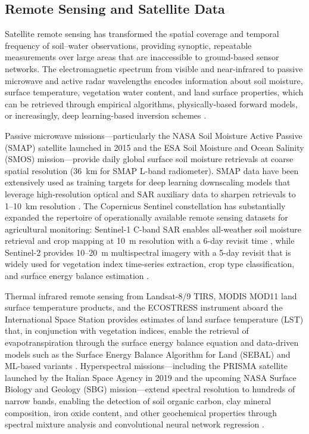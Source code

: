 \documentclass[land,article,submit,pdftex,moreauthors]{Definitions/mdpi}
\numberwithin{equation}{section}
\begin{document}
\subsection{Remote Sensing and Satellite Data}

Satellite remote sensing has transformed the spatial coverage and temporal frequency of soil--water observations, providing synoptic, repeatable measurements over large areas that are inaccessible to ground-based sensor networks. The electromagnetic spectrum from visible and near-infrared to passive microwave and active radar wavelengths encodes information about soil moisture, surface temperature, vegetation water content, and land surface properties, which can be retrieved through empirical algorithms, physically-based forward models, or increasingly, deep learning-based inversion schemes \citep{petropoulos2015}.

Passive microwave missions---particularly the NASA Soil Moisture Active Passive (SMAP) satellite launched in 2015 and the ESA Soil Moisture and Ocean Salinity (SMOS) mission---provide daily global surface soil moisture retrievals at coarse spatial resolution (36~km for SMAP L-band radiometer). SMAP data have been extensively used as training targets for deep learning downscaling models that leverage high-resolution optical and SAR auxiliary data to sharpen retrievals to 1--10~km resolution \citep{fang2019deep}. The Copernicus Sentinel constellation has substantially expanded the repertoire of operationally available remote sensing datasets for agricultural monitoring: Sentinel-1 C-band SAR enables all-weather soil moisture retrieval and crop mapping at 10~m resolution with a 6-day revisit time \citep{hajj2017soil}, while Sentinel-2 provides 10--20~m multispectral imagery with a 5-day revisit that is widely used for vegetation index time-series extraction, crop type classification, and surface energy balance estimation \citep{Lemenkova202405}.

Thermal infrared remote sensing from Landsat-8/9 TIRS, MODIS MOD11 land surface temperature products, and the ECOSTRESS instrument aboard the International Space Station provides estimates of land surface temperature (LST) that, in conjunction with vegetation indices, enable the retrieval of evapotranspiration through the surface energy balance equation and data-driven models such as the Surface Energy Balance Algorithm for Land (SEBAL) and ML-based variants \citep{allen1998crop, song2022deep, Lemenkova202221}. Hyperspectral missions---including the PRISMA satellite launched by the Italian Space Agency in 2019 and the upcoming NASA Surface Biology and Geology (SBG) mission---extend spectral resolution to hundreds of narrow bands, enabling the detection of soil organic carbon, clay mineral composition, iron oxide content, and other geochemical properties through spectral mixture analysis and convolutional neural network regression \citep{hong2021multimodal}.
\end{document}
